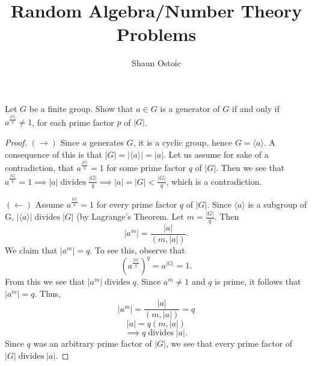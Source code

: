 \documentclass[11pt]{article}
\renewcommand{\gcd}[2]{(#1, #2)}
\newcommand{\order}[1]{|#1|}
\newcommand{\divides}{\mathbin{\text{\ divides\ }}}
\newcommand{\cyclic}[1]{\langle #1 \rangle}
\newcommand{\necessary}{$(\rightarrow)$ }
\newcommand{\sufficient}{$(\leftarrow)$ }
\newenvironment{exercise}[2][Exercise]{\begin{trivlist}
\item[\hskip \labelsep {\bfseries #1}\hskip \labelsep {\bfseries #2.}]}{\end{trivlist}}
\begin{document}
 
 
\title{Random Algebra/Number Theory Problems}
\author{Shaun Ostoic} 
 
\maketitle

\begin{exercise}{1}
Let $G$ be a finite group. Show that $a \in G$ is a generator of $G$ if and only if $a^{\frac{\order{G}}{q}} \neq 1$, for each prime factor $p$ of $\order{G}$.
\end{exercise}

\begin{proof}\necessary Since $a$ generates $G$, it is a cyclic group, hence $ G = \cyclic{a} $. A consequence of this is that $ \order{G} = \order{\cyclic{a}} = \order{a} $. Let us assume for sake of a contradiction, that $a^{\frac{\order{G}}{q}} = 1$ for some prime factor $ q $ of $ \order{G} $. Then we see that $ a^{\frac{\order{G}}{q}} = 1 \implies \order{a} \divides \frac{\order{G}}{q} \implies \order{a} = \order{G} < \frac{\order{G}}{q}$, which is a contradiction.

\sufficient Assume $ a^{\frac{\order{G}}{q}} = 1$ for every prime factor $ q $ of $ \order{G} $. Since $ \cyclic{a} $ is a subgroup of G, $ \order{\cyclic{a}} \divides \order{G}$ (by Lagrange's Theorem. Let $ m = \frac{\order{G}}{q} $. Then 
\[ \order{a^{m}} = \frac{\order{a}}{\gcd{m}{\order{a}}}. \]
We claim that $ \order{a^{m}} = q$. To see this, observe that
\[ (a^{\frac{\order{G}}{q}})^{q} = a^{\order{G}} = 1.\]
From this we see that $ \order{a^{m}} \divides q$. Since $ a^{m} \neq 1$ and $ q $ is prime, it follows that $ \order{a^{m}} = q$. Thus,
\[ \order{a^{m}} = \frac{\order{a}}{\gcd{m}{\order{a}}} = q\]
\[ \order{a} = q \gcd{m}{\order{a}}\]
\[ \implies q \divides \order{a}. \]
Since $ q $ was an arbitrary prime factor of $ \order{G} $, we see that every prime factor of $ \order{G} \divides \order{a}$.
\end{proof}
\end{document}
